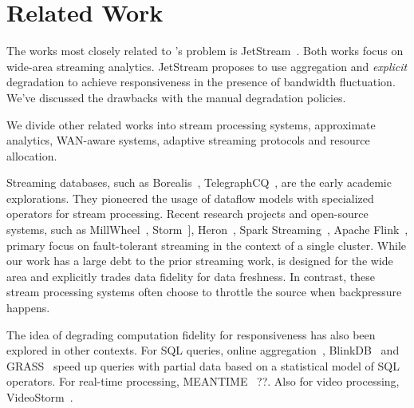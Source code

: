 \section{Related Work}
\label{sec:related-work}

The works most closely related to \sysname{}'s problem is
JetStream~\cite{rabkin2014aggregation}. Both works focus on wide-area streaming
analytics. JetStream proposes to use aggregation and \textit{explicit}
degradation to achieve responsiveness in the presence of bandwidth fluctuation.
We've discussed the drawbacks with the manual degradation policies.

We divide other related works into stream processing systems, approximate
analytics, WAN-aware systems, adaptive streaming protocols and resource
allocation.

 Streaming databases, such as
Borealis~\cite{abadi2005design},
TelegraphCQ~\cite{chandrasekaran2003telegraphcq}, are the early academic
explorations. They pioneered the usage of dataflow models with specialized
operators for stream processing. Recent research projects and open-source
systems, such as MillWheel~\cite{akidau2013millwheel},
Storm~\cite{toshniwal2014storm}], Heron~\cite{sanjeev2015twitter}, Spark
Streaming~\cite{zaharia2013discretized}, Apache Flink~\cite{carbone2015apache},
primary focus on fault-tolerant streaming in the context of a single
cluster. While our work has a large debt to the prior streaming work, \sysname{}
is designed for the wide area and explicitly trades data fidelity for data
freshness. In contrast, these stream processing systems often choose to throttle
the source when backpressure happens.

 The idea of degrading computation fidelity for
responsiveness has also been explored in other contexts. For SQL queries, online
aggregation~\cite{hellerstein1997online}, BlinkDB~\cite{agarwal2013blinkdb} and
GRASS~\cite{ananthanarayanan2014grass} speed up queries with partial data based
on a statistical model of SQL operators. For real-time processing,
MEANTIME~\cite{farrell2016meantime} ??. Also for video processing,
VideoStorm~\cite{zhang2017live}.

